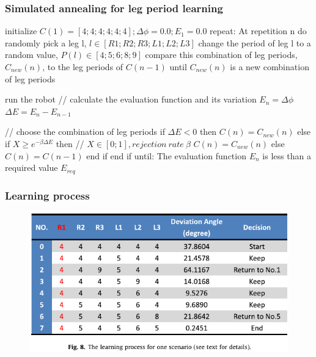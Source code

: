 \documentclass{beamer}
\begin{document}
\begin{frame}[fragile]
\frametitle{Simulated annealing for leg period learning}
\begin{algorithm}[mathescape]
initialize $C(1)= [4; 4; 4; 4; 4; 4]; \Delta\phi= 0.0; E_1 = 0.0$
repeat:
    At repetition n
    do
        randomly pick a leg l, $l \in [R1; R2; R3; L1; L2; L3]$
        change the period of leg l to a random value, $P(l) \in [4; 5; 6; 8; 9]$
        compare this combination of leg periods, $C_{new}(n)$, to the leg periods of $C(n-1)$
    until $C_{new}(n)$ is a new combination of leg periods
    
    run the robot
    // calculate the evaluation function and its variation
    $E_n = \Delta\phi$
    $\Delta E = E_n - E_{n-1}$
    
    // choose the combination of leg periods
    if $\Delta E < 0$ then
        $C(n) = C_{new}(n)$
    else
        if  $X \geq e^{-\beta \Delta E}$ then // $X \in [0;1], rejection~rate~\beta$ 
            $C(n) = C_{new}(n)$
        else
            $C(n) = C(n - 1)$
        end if
    end if
until: The evaluation function $E_n$ is less than a required value $E_{req}$
\end{algorithm}
\end{frame}

\begin{frame}
\frametitle{Learning process}
\begin{figure}
\center
\includegraphics[width=1\textwidth]{figs/learning-process.pdf}
\end{figure}
\end{frame}
\end{document}
